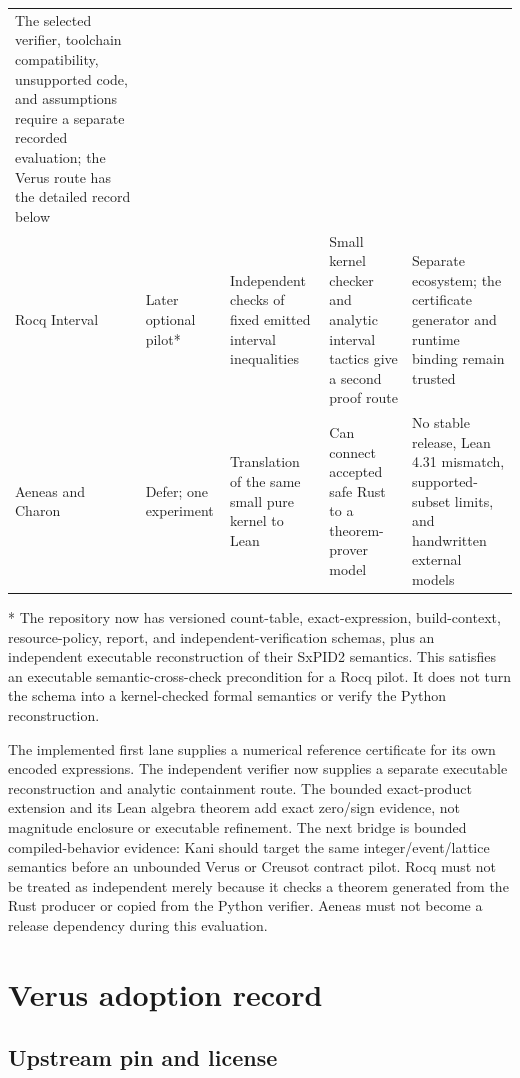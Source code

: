 \documentclass[11pt]{article}
\begin{document}
\begin{longtable}{
  L{0.12\textwidth}
  L{0.14\textwidth}
  L{0.17\textwidth}
  L{0.17\textwidth}
  L{0.18\textwidth}}
The selected verifier, toolchain compatibility, unsupported code, and assumptions require a
separate recorded evaluation; the Verus route has the detailed record below \\
Rocq Interval & Later optional pilot* &
Independent checks of fixed emitted interval inequalities &
Small kernel checker and analytic interval tactics give a second proof route &
Separate ecosystem; the certificate generator and runtime binding remain trusted \\
Aeneas and Charon & Defer; one experiment & Translation of the same small pure kernel to Lean &
Can connect accepted safe Rust to a theorem-prover model &
No stable release, Lean 4.31 mismatch, supported-subset limits, and handwritten external models \\
\bottomrule
\end{longtable}
\normalsize

* The repository now has versioned count-table, exact-expression, build-context, resource-policy,
report, and independent-verification schemas, plus an independent executable reconstruction of
their SxPID2 semantics.  This satisfies an executable semantic-cross-check precondition for a Rocq
pilot.  It does not turn the schema into a kernel-checked formal semantics or verify the Python
reconstruction.

The implemented first lane supplies a numerical reference certificate for its own encoded
expressions.  The independent verifier now supplies a separate executable reconstruction and
analytic containment route.  The bounded exact-product extension and its Lean algebra theorem add
exact zero/sign evidence, not magnitude enclosure or executable refinement.  The next bridge is
bounded compiled-behavior evidence: Kani should
target the same integer/event/lattice semantics before an unbounded Verus or Creusot contract
pilot.  Rocq must not be treated as independent merely because it checks a theorem generated from
the Rust producer or copied from the Python verifier.  Aeneas must not become a release dependency
during this evaluation.

\section{Verus adoption record}

\subsection{Upstream pin and license}
\end{document}
